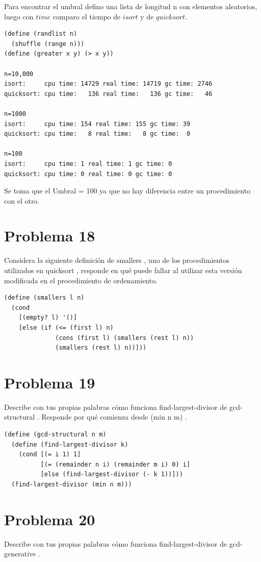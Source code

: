 \documentclass[a4paper,11pt]{article}
\theoremstyle{mytheor}
\begin{document}
Para encontrar el umbral defino una lista de longitud n con elementos aleatorios, luego con $time$ comparo el tiempo de $isort$ y de $quicksort$.
\begin{lstlisting}[title= timing quicksort and isort]
(define (randlist n)
  (shuffle (range n)))
(define (greater x y) (> x y))

n=10,000
isort:     cpu time: 14729 real time: 14719 gc time: 2746
quicksort: cpu time:   136 real time:   136 gc time:   46

n=1000
isort:     cpu time: 154 real time: 155 gc time: 39
quicksort: cpu time:   8 real time:   8 gc time:  0

n=100
isort:     cpu time: 1 real time: 1 gc time: 0
quicksort: cpu time: 0 real time: 0 gc time: 0

\end{lstlisting}
Se toma que el Umbral = 100 ya que no hay diferencia entre un procedimiento con el otro.

\section*{Problema 18}
Considera la siguiente definición de smallers , uno de los procedimientos utilizados
en quicksort , responde en qué puede fallar al utilizar esta versión modificada en el procedimiento
de ordenamiento.

\begin{lstlisting}[title = smallers]
(define (smallers l n)
  (cond
    [(empty? l) '()]
    [else (if (<= (first l) n)
              (cons (first l) (smallers (rest l) n))
              (smallers (rest l) n))]))
\end{lstlisting}

\section*{Problema 19}
Describe con tus propias palabras cómo funciona find-largest-divisor de gcd-structural . Responde por qué comienza desde (min n m) .

\begin{lstlisting}[title = gcd-structural]
(define (gcd-structural n m)
  (define (find-largest-divisor k)
    (cond [(= i 1) 1]
          [(= (remainder n i) (remainder m i) 0) i]
          [else (find-largest-divisor (- k 1))]))
  (find-largest-divisor (min n m)))
\end{lstlisting}

\section*{Problema 20}
Describe con tus propias palabras cómo funciona find-largest-divisor de gcd-
generative .
\end{document}
